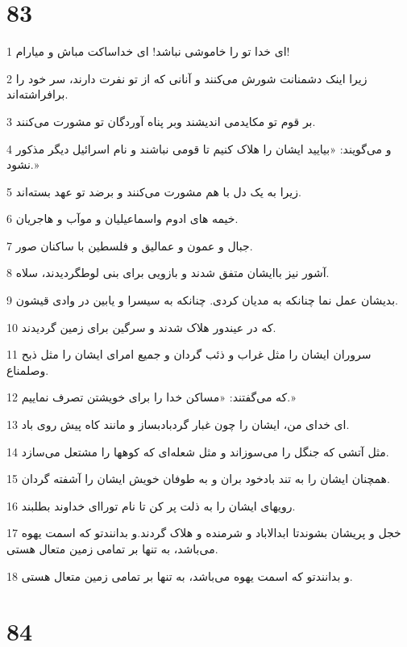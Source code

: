 \chapter{83}

\par 1 ای خدا تو را خاموشی نباشد! ای خداساکت مباش و میارام! 
\par 2 زیرا اینک دشمنانت شورش می‌کنند و آنانی که از تو نفرت دارند، سر خود را برافراشته‌اند.
\par 3 بر قوم تو مکایدمی اندیشند وبر پناه آوردگان تو مشورت می‌کنند.
\par 4 و می‌گویند: «بیایید ایشان را هلاک کنیم تا قومی نباشند و نام اسرائیل دیگر مذکور نشود.»
\par 5 زیرا به یک دل با هم مشورت می‌کنند و برضد تو عهد بسته‌اند.
\par 6 خیمه های ادوم واسماعیلیان و موآب و هاجریان.
\par 7 جبال و عمون و عمالیق و فلسطین با ساکنان صور.
\par 8 آشور نیز باایشان متفق شدند و بازویی برای بنی لوطگردیدند، سلاه.
\par 9 بدیشان عمل نما چنانکه به مدیان کردی. چنانکه به سیسرا و یابین در وادی قیشون.
\par 10 که در عیندور هلاک شدند و سرگین برای زمین گردیدند.
\par 11 سروران ایشان را مثل غراب و ذئب گردان و جمیع امرای ایشان را مثل ذبح وصلمناع.
\par 12 که می‌گفتند: «مساکن خدا را برای خویشتن تصرف نماییم.»
\par 13 ‌ای خدای من، ایشان را چون غبار گردبادبساز و مانند کاه پیش روی باد.
\par 14 مثل آتشی که جنگل را می‌سوزاند و مثل شعله‌ای که کوهها را مشتعل می‌سازد.
\par 15 همچنان ایشان را به تند بادخود بران و به طوفان خویش ایشان را آشفته گردان.
\par 16 رویهای ایشان را به ذلت پر کن تا نام تورا‌ای خداوند بطلبند.
\par 17 خجل و پریشان بشوندتا ابدالاباد و شرمنده و هلاک گردند.و بدانندتو که اسمت یهوه می‌باشد، به تنها بر تمامی زمین متعال هستی.
\par 18 و بدانندتو که اسمت یهوه می‌باشد، به تنها بر تمامی زمین متعال هستی.
 
\chapter{84}

